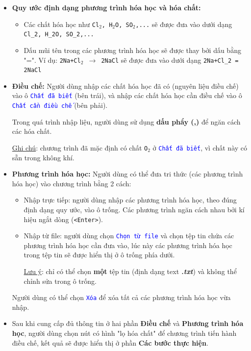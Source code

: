 \documentclass[a4paper]{article}
\begin{document}
		\begin{itemize}
			\item \textbf{Quy ước định dạng phương trình hóa học và hóa chất:} 
			\begin{itemize}
				\item Các chất hóa học như \texttt{Cl$_2$, H$_2$O, SO$_2$,...} sẽ được đưa vào dưới dạng \texttt{Cl\_2, H\_2O, SO\_2,...}
				\item Dấu mũi tên trong các phương trình hóa học sẽ được thay bởi dấu bằng "=". Ví dụ: \texttt{2Na+Cl$_2$ $\rightarrow$ 2NaCl} sẽ được đưa vào dưới dạng \texttt{2Na+Cl\_2 = 2NaCl}
			\end{itemize}
		
			\item \textbf{Điều chế:} Người dùng nhập các chất hóa học đã có (nguyên liệu điều chế) vào ô \textcolor{blue}{\texttt{Chất đã biết}} (bên trái), và nhập các chất hóa học cần điều chế vào ô \textcolor{blue}{\texttt{Chất cần điều chế}} (bên phải). 
			
			Trong quá trình nhập liệu, người dùng sử dụng \textbf{dấu phẩy (,)} để ngăn cách các hóa chất.
			
			\underline{Ghi chú}: chương trình đã mặc định có chất \texttt{O$_2$} ở \textcolor{blue}{\texttt{Chất đã biết}}, vì chất này có sẵn trong không khí.
			
			\item \textbf{Phương trình hóa học:} Người dùng có thể đưa tri thức (các phương trình hóa học) vào chương trình bằng 2 cách:
			\begin{itemize}
				\item Nhập trực tiếp: người dùng nhập các phương trình hóa học, theo đúng định dạng quy ước, vào ô trống. Các phương trình ngăn cách nhau bởi kí hiệu ngắt dòng (\texttt{<Enter>}).
				
				\item Nhập từ file: người dùng chọn \textcolor{blue}{\texttt{Chọn từ file}} và chọn tệp tin chứa các phương trình hóa học cần đưa vào, lúc này các phương trình hóa học trong tệp tin sẽ được hiển thị ở ô trống phía dưới.
				
				\underline{Lưu ý}: chỉ có thể chọn \textbf{một} tệp tin (định dạng text \textbf{\textit{.txt}}) và không thể chỉnh sửa trong ô trống.
			\end{itemize}
		
			Người dùng có thể chọn \textcolor{blue}{\texttt{Xóa}} để xóa tất cả các phương trình hóa học vừa nhập.
			
			\item Sau khi cung cấp đủ thông tin ở hai phần \textbf{Điều chế} và \textbf{Phương trình hóa học}, người dùng chọn nút có hình "lọ hóa chất" để chương trình tiến hành điều chế, kết quả sẽ được hiển thị ở phần \textbf{Các bước thực hiện}.
		\end{itemize}
	
\end{document}
